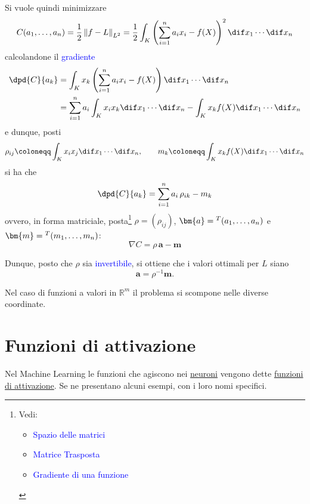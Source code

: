 \documentclass[10pt]{book}
\newcommand{\1}{\mathds{1}}
\newcommand{\R}{\mathds{R}}
\newcommand{\norma}[1]{%
\left\lVert#1\right\rVert%
}
\theoremstyle{definition}%
\theoremstyle{plain}
\theoremstyle{remark}
\renewcommand{\href}[2]{\textcolor{blue}{#2}}
\begin{document}
Si vuole quindi minimizzare
\begin{equation*}
C(a_{1},\dots,a_{n}) = \frac{1}{2}\norma{f-L}_{L^{2}} = \frac{1}{2}\int_{K} \left(\sum_{i=1}^{n} a_{i}x_{i} - f(X)\right)^{2}\dif x_{1}\cdots\dif x_{n}
\end{equation*}
calcolandone il \href{../../../../../org/roam/20250624171244-gradiente_di_una_funzione.org}{gradiente}
\begin{align*}
\dpd{C}{a_{k}} &= \int_{K} x_{k} \left(\sum_{i=1}^{n} a_{i}x_{i} - f(X)\right)\dif x_{1}\cdots\dif x_{n}\\
&= \sum_{i=1}^{n} a_{i} \int_{K} x_{i} x_{k}\dif x_{1}\cdots\dif x_{n} - \int_{K} x_{k} f(X)\dif x_{1}\cdots\dif x_{n}
\end{align*}
e dunque, posti
\begin{equation*}
\rho_{ij} \coloneqq \int_{K} x_{i}x_{j}\dif x_{1}\cdots\dif x_{n},\qquad m_{k} \coloneqq \int_{K} x_{k}f(X)\dif x_{1}\cdots\dif x_{n}
\end{equation*}
si ha che
\begin{equation*}
\dpd{C}{a_{k}} = \sum_{i=1}^{n}a_{i}\,\rho_{ik} - m_{k}
\end{equation*}
ovvero, in forma matriciale, posta\footnote{Vedi:
\begin{itemize}
\item \href{../../../../../org/roam/20250104111539-spazio_delle_matrici.org}{Spazio delle matrici}
\item \href{../../../../../org/roam/20250113144338-matrice_trasposta.org}{Matrice Trasposta}
\item \href{../../../../../org/roam/20250624171244-gradiente_di_una_funzione.org}{Gradiente di una funzione}
\end{itemize}} \(\rho=(\rho_{ij})\), \(\bm{a} = \null^{T}(a_{1},\dots,a_{n})\) e \(\bm{m} = \null^{T}(m_{1},\dots,m_{n})\):
\begin{equation*}
\nabla C = \rho\, \bm{a} - \bm{m}
\end{equation*}

Dunque, posto che \(\rho\) sia \href{../../../../../org/roam/20250104111735-matrice_invertibile.org}{invertibile}, si ottiene che i valori ottimali per \(L\) siano
\begin{equation*}
\bm{a} = \rho^{-1}\bm{m}.
\end{equation*}

Nel caso di funzioni a valori in \(\R^{m}\) il problema si scompone nelle diverse coordinate.
\section{Funzioni di attivazione}
\label{sec:orgeed12bd}
Nel Machine Learning le funzioni che agiscono nei \hyperref[sec:org3008588]{neuroni} vengono dette \uline{funzioni di attivazione}. Se ne presentano alcuni esempi, con i loro nomi specifici.
\end{document}
